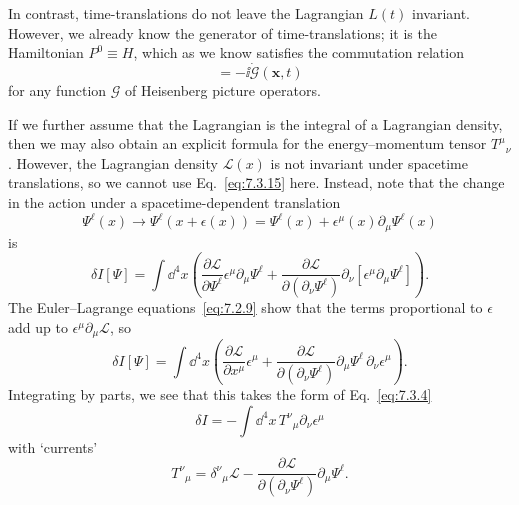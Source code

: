 In contrast, time-translations do not leave the Lagrangian $L(t)$ invariant.
However, we already know the generator of time-translations; it is the
Hamiltonian $P^0\equiv H$, which as we know satisfies the commutation relation
\begin{equation}
[H,\mathcal{G}(\mathbf{x},t)]=-\ii\dot{\mathcal{G}}(\mathbf{x},t)
\tag{7.3.29}\label{eq:7.3.29}
\end{equation}
for any function $\mathcal{G}$ of Heisenberg picture operators.

If we further assume that the Lagrangian is the integral of a Lagrangian
density, then we may also obtain an explicit formula for the energy--momentum
tensor $T^\mu{}_\nu$. However, the Lagrangian density $\mathcal{L}(x)$ is not
invariant under spacetime translations, so we cannot use Eq.~\eqref{eq:7.3.15} here.
Instead, note that the change in the action under a spacetime-dependent
translation
\begin{equation}
\Psi^\ell(x)\longrightarrow\Psi^\ell(x+\epsilon(x))
=\Psi^\ell(x)+\epsilon^\mu(x)\partial_\mu\Psi^\ell(x)
\tag{7.3.30}\label{eq:7.3.30}
\end{equation}
is
\begin{equation}
\delta I[\Psi]=\int \dd^4x\left(
\frac{\partial\mathcal{L}}{\partial\Psi^\ell}\epsilon^\mu\partial_\mu\Psi^\ell
+\frac{\partial\mathcal{L}}{\partial(\partial_\nu\Psi^\ell)}
\partial_\nu[\epsilon^\mu\partial_\mu\Psi^\ell]\right).
\tag{7.3.31}\label{eq:7.3.31}
\end{equation}
The Euler--Lagrange equations~\eqref{eq:7.2.9} show that the terms proportional to
$\epsilon$ add up to $\epsilon^\mu\partial_\mu\mathcal{L}$, so
\begin{equation}
\delta I[\Psi]=\int \dd^4x\left(
\frac{\partial\mathcal{L}}{\partial x^\mu}\epsilon^\mu
+\frac{\partial\mathcal{L}}{\partial(\partial_\nu\Psi^\ell)}
\partial_\mu\Psi^\ell\,\partial_\nu\epsilon^\mu\right).
\tag{7.3.32}\label{eq:7.3.32}
\end{equation}
Integrating by parts, we see that this takes the form of Eq.~\eqref{eq:7.3.4}
\begin{equation}
\delta I=-\int \dd^4x\,T^\nu{}_\mu\partial_\nu\epsilon^\mu
\tag{7.3.33}\label{eq:7.3.33}
\end{equation}
with `currents'
\begin{equation}
T^\nu{}_\mu=\delta^\nu{}_\mu\mathcal{L}
-\frac{\partial\mathcal{L}}{\partial(\partial_\nu\Psi^\ell)}
\partial_\mu\Psi^\ell.
\tag{7.3.34}\label{eq:7.3.34}
\end{equation}
